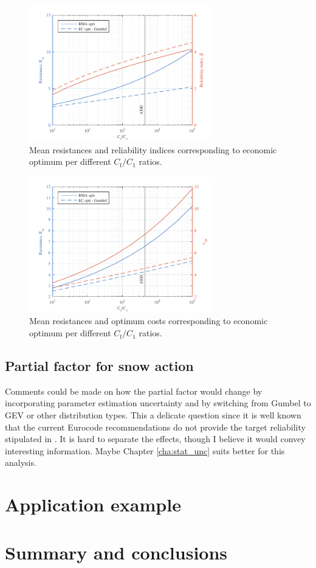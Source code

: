 \begin{figure}[htbp!] 
	\centering    
	\includegraphics[width=0.7\textwidth]{comp_gumbel_bma_cf_c1_par_beta.pdf}
	\caption{Mean resistances and reliability indices corresponding to economic optimum per different ${C_{\mathrm{f}}}/{C_1}$ ratios.}
	\label{fig:comp_gumbel_bma_res_beta}
\end{figure}

\begin{figure}[htbp!] 
	\centering    
	\includegraphics[width=0.7\textwidth]{comp_gumbel_bma_cf_c1_par_c_opt.pdf}
	\caption{Mean resistances and optimum costs corresponding to economic optimum per different ${C_{\mathrm{f}}}/{C_1}$ ratios.}
	\label{fig:comp_gumbel_bma_res_cost}
\end{figure}

\subsection{Partial factor for snow action}

Comments could be made on how the partial factor would change by incorporating parameter estimation uncertainty and by switching from Gumbel to GEV or other distribution types.
This a delicate question since it is well known that the current Eurocode recommendations do not provide the target reliability stipulated in \citep{EN0}. It is hard to separate the effects, though I believe it would convey interesting information.
Maybe Chapter \ref{cha:stat_unc} suits better for this analysis.


\section{Application example}

\section{Summary and conclusions}

